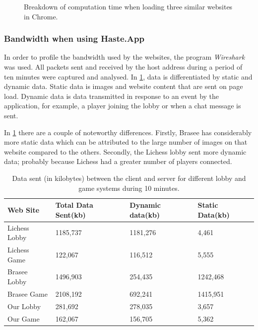 \documentclass[a4paper]{article}
\begin{document}
\begin{figure}[H]
\begin{subfigure}{0.32\textwidth}
    \end{subfigure}
    
    \caption{Breakdown of computation time when loading three similar websites in Chrome.}
    \label{fig:hastings-comparison}
\end{figure}

\subsubsection{Bandwidth when using Haste.App}
In order to profile the bandwidth used by the websites, the program \textit{Wireshark} was used. All packets sent and received by the host address during a period of ten minutes were captured and analysed. In \cref{tab:site-comparisons}, data is differentiated by static and dynamic data. Static data is images and website content that are sent on page load. Dynamic data is data transmitted in response to an event by the application, for example, a player joining the lobby or when a chat message is sent. 

In \cref{tab:site-comparisons} there are a couple of noteworthy differences. Firstly, Brasee has considerably more static data which can be attributed to the large number of images on that website compared to the others. Secondly, the Lichess lobby sent more dynamic data; probably because Lichess had a greater number of players connected.

\begin{table}[H]
\centering
\begin{tabular}{|l|l|l|l|}
\hline
\textbf{Web Site} & \textbf{Total Data Sent}(kb) & \textbf{Dynamic data}(kb)     & \textbf{Static Data}(kb)\\ \hline
Lichess Lobby  & 1185,737         & 1181,276    & 4,461       \\ \hline
Lichess Game   & 122,067          & 116,512     & 5,555       \\ \hline
Brasee Lobby   & 1496,903         & 254,435     & 1242,468    \\ \hline
Brasee Game    & 2108,192         & 692,241     & 1415,951    \\ \hline
Our Lobby      & 281,692          & 278,035     & 3,657       \\ \hline
Our Game       & 162,067          & 156,705     & 5,362       \\ \hline
\end{tabular}
\caption{Data sent (in kilobytes) between the client and server for different lobby and game systems during 10 minutes.}
\label{tab:site-comparisons}
\end{table}
\end{document}
